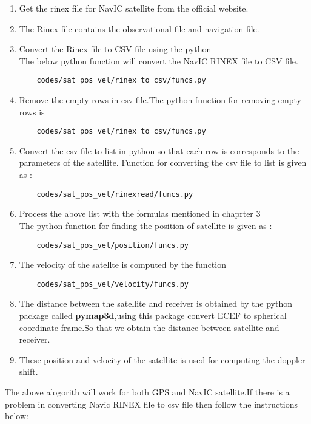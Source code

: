 \begin{enumerate}
  \item Get the rinex file for NavIC satellite from the official website.
  \item The Rinex file contains the observational file and navigation file.
  \item Convert the Rinex file to CSV file using the python \\
  The below python function will convert the NavIC RINEX file to CSV file.
  \begin{lstlisting}
    codes/sat_pos_vel/rinex_to_csv/funcs.py
  \end{lstlisting}
  \item Remove the empty rows in csv file.The python function for removing empty rows is 
  \begin{lstlisting}
    codes/sat_pos_vel/rinex_to_csv/funcs.py
  \end{lstlisting}
  \item Convert the csv file to list in python so that each row is corresponds to the parameters of the satellite. Function for converting the csv file to list is given as :
  \begin{lstlisting}
    codes/sat_pos_vel/rinexread/funcs.py
  \end{lstlisting} 
  \item Process the above list with the formulas mentioned in chaprter 3 \\
  The python function for finding the position of satellite is given as :
  \begin{lstlisting}
    codes/sat_pos_vel/position/funcs.py
  \end{lstlisting}
  \item The velocity of the satellte is computed by the function 
  \begin{lstlisting}
    codes/sat_pos_vel/velocity/funcs.py
  \end{lstlisting}
  \item The distance between the satellite and receiver is obtained by the python package called \textbf{pymap3d},using this package convert ECEF to spherical coordinate frame.So that we obtain the distance between satellite and receiver.
  \item These position and velocity of the satellite is used for computing the doppler shift.
\end{enumerate}
\vspace{5mm}
The above alogorith will work for both GPS and NavIC satellite.If there is a problem in converting Navic RINEX file to csv file then follow the instructions below:
